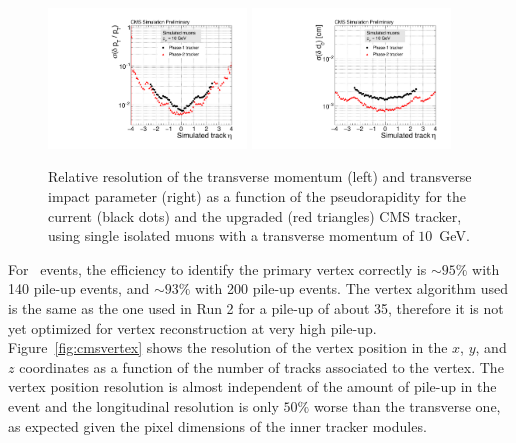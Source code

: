 \begin{figure}[h!tbp]
\begin{center}
  \includegraphics[width=0.47\textwidth]{figures/cmsupgrade/TDR-17-001_fig6_12_a_ptres_vs_eta_Sigma_vsPhase1.pdf} \hfill
  \includegraphics[width=0.47\textwidth]{figures/cmsupgrade/TDR-17-001_fig6_12_b_dxyres_vs_eta_Sigma_vsPhase1.pdf}
  \caption{ Relative resolution of the transverse momentum (left) and transverse impact parameter (right) as a function of the pseudorapidity for the current (black dots) and the upgraded (red triangles) CMS tracker, using single isolated muons with a transverse momentum of $10$~GeV. 
 }
  \label{fig:cmstrackres}
\end{center}
\end{figure}

For \ttbar~events, the efficiency to identify the primary vertex correctly is $\sim 95\%$ with 140 pile-up events, and $\sim93\%$ with 200 pile-up events. The vertex algorithm used is the
same as the one used in Run 2 for a pile-up of about 35, therefore it is not yet optimized for vertex
reconstruction at very high pile-up.
Figure~\ref{fig:cmsvertex} shows the resolution of the vertex position in the $x$, $y$, and $z$ coordinates as a function of the number of tracks associated to the vertex. 
The vertex position resolution is almost independent of the amount of pile-up in the event and the longitudinal resolution is only $50\%$
worse than the transverse one, as expected given the pixel dimensions of the inner tracker modules.

